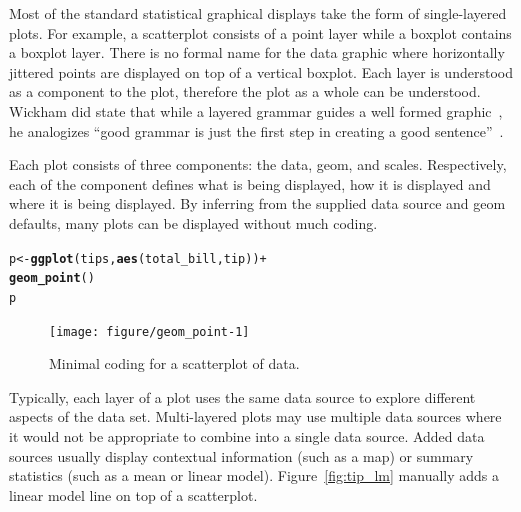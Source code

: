 \documentclass[stat,dissertation]{puthesis}\usepackage[]{graphicx}\usepackage{xcolor}
\makeatletter
\newcommand{\hlopt}[1]{\textcolor[rgb]{0,0,0}{#1}}%
\newcommand{\hlstd}[1]{\textcolor[rgb]{0.345,0.345,0.345}{#1}}%
\newcommand{\hlkwb}[1]{\textcolor[rgb]{0.69,0.353,0.396}{#1}}%
\newcommand{\hlkwd}[1]{\textcolor[rgb]{0.737,0.353,0.396}{\textbf{#1}}}%
\newenvironment{kframe}{%
 \def\at@end@of@kframe{}%
 \ifinner\ifhmode%
  \def\at@end@of@kframe{\end{minipage}}%
  \begin{minipage}{\columnwidth}%
 \fi\fi%
 \def\FrameCommand##1{\hskip\@totalleftmargin \hskip-\fboxsep
 \colorbox{shadecolor}{##1}\hskip-\fboxsep
     \hskip-\linewidth \hskip-\@totalleftmargin \hskip\columnwidth}%
 \MakeFramed {\advance\hsize-\width
   \@totalleftmargin\z@ \linewidth\hsize
   \@setminipage}}%
 {\par\unskip\endMakeFramed%
 \at@end@of@kframe}
\newenvironment{knitrout}{}{} %
\renewenvironment{knitrout}{\setstretch{1}}{}
\makeatother
\begin{document}
Most of the standard statistical graphical displays take the form of single-layered plots.  For example, a scatterplot consists of a point layer while a boxplot contains a boxplot layer.  There is no formal name for the data graphic where horizontally jittered points are displayed on top of a vertical boxplot.  Each layer is understood as a component to the plot, therefore the plot as a whole can be understood.  Wickham did state that while a layered grammar guides a well formed graphic~\cite{layered_grammar}, he analogizes ``good grammar is just the first step in creating a good sentence''~\cite{layered_grammar}.

Each plot consists of three components: the data, geom, and scales. Respectively, each of the component defines what is being displayed, how it is displayed and where it is being displayed.  By inferring from the supplied data source and geom defaults, many plots can be displayed without much coding.

\begin{knitrout}\small
{}\color{fgcolor}\begin{kframe}
\begin{alltt}
\hlstd{p} \hlkwb{<-} \hlkwd{ggplot}\hlstd{(tips,} \hlkwd{aes}\hlstd{(total_bill, tip))} \hlopt{+}
  \hlkwd{geom_point}\hlstd{()}
\hlstd{p}
\end{alltt}
\end{kframe}\begin{figure}[H]

{\centering \texttt{[image: figure/geom\_point-1]} 

}

\caption{Minimal coding for a scatterplot of  data.}\label{fig:geom_point}
\end{figure}


\end{knitrout}

Typically, each layer of a plot uses the same data source to explore different aspects of the data set.  Multi-layered plots may use multiple data sources where it would not be appropriate to combine into a single data source.  Added data sources usually display contextual information (such as a map) or summary statistics (such as a mean or linear model).  Figure~\ref{fig:tip_lm} manually adds a linear model line on top of a scatterplot.
\end{document}
